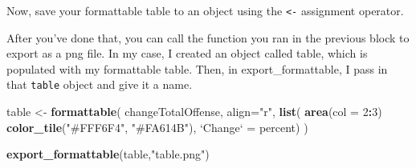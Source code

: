 \documentclass[]{book}
\newenvironment{Shaded}{\begin{snugshade}}{\end{snugshade}}
\newcommand{\KeywordTok}[1]{\textcolor[rgb]{0.13,0.29,0.53}{\textbf{#1}}}
\newcommand{\DataTypeTok}[1]{\textcolor[rgb]{0.13,0.29,0.53}{#1}}
\newcommand{\DecValTok}[1]{\textcolor[rgb]{0.00,0.00,0.81}{#1}}
\newcommand{\FloatTok}[1]{\textcolor[rgb]{0.00,0.00,0.81}{#1}}
\newcommand{\CharTok}[1]{\textcolor[rgb]{0.31,0.60,0.02}{#1}}
\newcommand{\StringTok}[1]{\textcolor[rgb]{0.31,0.60,0.02}{#1}}
\newcommand{\OtherTok}[1]{\textcolor[rgb]{0.56,0.35,0.01}{#1}}
\newcommand{\ControlFlowTok}[1]{\textcolor[rgb]{0.13,0.29,0.53}{\textbf{#1}}}
\newcommand{\OperatorTok}[1]{\textcolor[rgb]{0.81,0.36,0.00}{\textbf{#1}}}
\newcommand{\NormalTok}[1]{#1}
\begin{document}
\begin{Shaded}
\end{Shaded}

Now, save your formattable table to an object using the
\texttt{\textless{}-} assignment operator.

After you've done that, you can call the function you ran in the
previous block to export as a png file. In my case, I created an object
called table, which is populated with my formattable table. Then, in
export\_formattable, I pass in that \texttt{table} object and give it a
name.

\begin{Shaded}
\begin{Highlighting}[]
\NormalTok{table <-}\StringTok{ }\KeywordTok{formattable}\NormalTok{(}
\NormalTok{  changeTotalOffense, }
  \DataTypeTok{align=}\StringTok{"r"}\NormalTok{,}
  \KeywordTok{list}\NormalTok{(}
     \KeywordTok{area}\NormalTok{(}\DataTypeTok{col =} \DecValTok{2}\OperatorTok{:}\DecValTok{3}\NormalTok{) }\OperatorTok{~}\StringTok{ }\KeywordTok{color_tile}\NormalTok{(}\StringTok{"#FFF6F4"}\NormalTok{, }\StringTok{"#FA614B"}\NormalTok{),}
    \StringTok{`}\DataTypeTok{Change}\StringTok{`}\NormalTok{ =}\StringTok{ }\NormalTok{percent)}
\NormalTok{  )}

\KeywordTok{export_formattable}\NormalTok{(table,}\StringTok{"table.png"}\NormalTok{)}
\end{Highlighting}
\end{Shaded}
\end{document}
